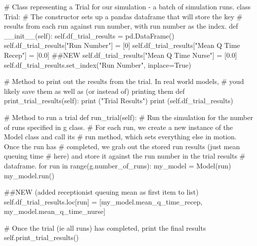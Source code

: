 \documentclass[
  letterpaper,
  DIV=11,
  numbers=noendperiod]{scrreprt}
\newenvironment{Shaded}{\begin{snugshade}}{\end{snugshade}}
\newcommand{\BuiltInTok}[1]{\textcolor[rgb]{0.00,0.23,0.31}{#1}}
\newcommand{\CommentTok}[1]{\textcolor[rgb]{0.37,0.37,0.37}{#1}}
\newcommand{\ControlFlowTok}[1]{\textcolor[rgb]{0.00,0.23,0.31}{#1}}
\newcommand{\DecValTok}[1]{\textcolor[rgb]{0.68,0.00,0.00}{#1}}
\newcommand{\FloatTok}[1]{\textcolor[rgb]{0.68,0.00,0.00}{#1}}
\newcommand{\FunctionTok}[1]{\textcolor[rgb]{0.28,0.35,0.67}{#1}}
\newcommand{\KeywordTok}[1]{\textcolor[rgb]{0.00,0.23,0.31}{#1}}
\newcommand{\NormalTok}[1]{\textcolor[rgb]{0.00,0.23,0.31}{#1}}
\newcommand{\OperatorTok}[1]{\textcolor[rgb]{0.37,0.37,0.37}{#1}}
\newcommand{\StringTok}[1]{\textcolor[rgb]{0.13,0.47,0.30}{#1}}
\newcommand{\VariableTok}[1]{\textcolor[rgb]{0.07,0.07,0.07}{#1}}
\begin{document}
\begin{tcolorbox}
\begin{Shaded}
\begin{Highlighting}[]
\CommentTok{\# Class representing a Trial for our simulation {-} a batch of simulation runs.}
\KeywordTok{class}\NormalTok{ Trial:}
    \CommentTok{\# The constructor sets up a pandas dataframe that will store the key}
    \CommentTok{\# results from each run against run number, with run number as the index.}
    \KeywordTok{def}  \FunctionTok{\_\_init\_\_}\NormalTok{(}\VariableTok{self}\NormalTok{):}
        \VariableTok{self}\NormalTok{.df\_trial\_results }\OperatorTok{=}\NormalTok{ pd.DataFrame()}
        \VariableTok{self}\NormalTok{.df\_trial\_results[}\StringTok{"Run Number"}\NormalTok{] }\OperatorTok{=}\NormalTok{ [}\DecValTok{0}\NormalTok{]}
        \VariableTok{self}\NormalTok{.df\_trial\_results[}\StringTok{"Mean Q Time Recep"}\NormalTok{] }\OperatorTok{=}\NormalTok{ [}\FloatTok{0.0}\NormalTok{] }\CommentTok{\#\#NEW}
        \VariableTok{self}\NormalTok{.df\_trial\_results[}\StringTok{"Mean Q Time Nurse"}\NormalTok{] }\OperatorTok{=}\NormalTok{ [}\FloatTok{0.0}\NormalTok{]}
        \VariableTok{self}\NormalTok{.df\_trial\_results.set\_index(}\StringTok{"Run Number"}\NormalTok{, inplace}\OperatorTok{=}\VariableTok{True}\NormalTok{)}

    \CommentTok{\# Method to print out the results from the trial.  In real world models,}
    \CommentTok{\# you\textquotesingle{}d likely save them as well as (or instead of) printing them}
    \KeywordTok{def}\NormalTok{ print\_trial\_results(}\VariableTok{self}\NormalTok{):}
        \BuiltInTok{print}\NormalTok{ (}\StringTok{"Trial Results"}\NormalTok{)}
        \BuiltInTok{print}\NormalTok{ (}\VariableTok{self}\NormalTok{.df\_trial\_results)}

    \CommentTok{\# Method to run a trial}
    \KeywordTok{def}\NormalTok{ run\_trial(}\VariableTok{self}\NormalTok{):}
        \CommentTok{\# Run the simulation for the number of runs specified in g class.}
        \CommentTok{\# For each run, we create a new instance of the Model class and call its}
        \CommentTok{\# run method, which sets everything else in motion.  Once the run has}
        \CommentTok{\# completed, we grab out the stored run results (just mean queuing time}
        \CommentTok{\# here) and store it against the run number in the trial results}
        \CommentTok{\# dataframe.}
        \ControlFlowTok{for}\NormalTok{ run }\KeywordTok{in} \BuiltInTok{range}\NormalTok{(g.number\_of\_runs):}
\NormalTok{            my\_model }\OperatorTok{=}\NormalTok{ Model(run)}
\NormalTok{            my\_model.run()}

            \CommentTok{\#\#NEW (added receptionist queuing mean as first item to list)}
            \VariableTok{self}\NormalTok{.df\_trial\_results.loc[run] }\OperatorTok{=}\NormalTok{ [my\_model.mean\_q\_time\_recep,}
\NormalTok{                                              my\_model.mean\_q\_time\_nurse]}

        \CommentTok{\# Once the trial (ie all runs) has completed, print the final results}
        \VariableTok{self}\NormalTok{.print\_trial\_results()}
\end{Highlighting}
\end{Shaded}

\end{tcolorbox}
\end{document}
